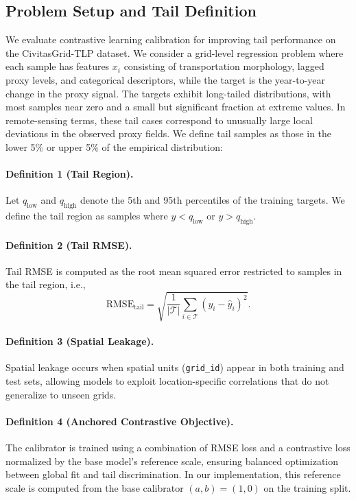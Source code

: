 \documentclass[preprint,12pt]{elsarticle}
\begin{document}
\subsection{Problem Setup and Tail Definition}
\label{sec:problem_setup}

We evaluate contrastive learning calibration for improving tail performance on the CivitasGrid-TLP dataset. We consider a grid-level regression problem where each sample has features $x_i$ consisting of transportation morphology, lagged proxy levels, and categorical descriptors, while the target is the year-to-year change in the proxy signal. The targets exhibit long-tailed distributions, with most samples near zero and a small but significant fraction at extreme values. In remote-sensing terms, these tail cases correspond to unusually large local deviations in the observed proxy fields. We define tail samples as those in the lower 5\% or upper 5\% of the empirical distribution:

\paragraph{Definition 1 (Tail Region).}
Let $q_{\mathrm{low}}$ and $q_{\mathrm{high}}$ denote the 5th and 95th percentiles of the training targets. We define the tail region as samples where $y < q_{\mathrm{low}}$ or $y > q_{\mathrm{high}}$.

\paragraph{Definition 2 (Tail RMSE).}
Tail RMSE is computed as the root mean squared error restricted to samples in the tail region, i.e.,
\begin{equation}
\mathrm{RMSE}_{\mathrm{tail}}=\sqrt{\frac{1}{|\mathcal{T}|}\sum_{i\in\mathcal{T}}(y_i-\hat{y}_i)^2}.
\end{equation}

\paragraph{Definition 3 (Spatial Leakage).}
Spatial leakage occurs when spatial units (\texttt{grid\_id}) appear in both training and test sets, allowing models to exploit location-specific correlations that do not generalize to unseen grids.

\paragraph{Definition 4 (Anchored Contrastive Objective).}
The calibrator is trained using a combination of RMSE loss and a contrastive loss normalized by the base model's reference scale, ensuring balanced optimization between global fit and tail discrimination. In our implementation, this reference scale is computed from the base calibrator $(a,b)=(1,0)$ on the training split.
\end{document}
